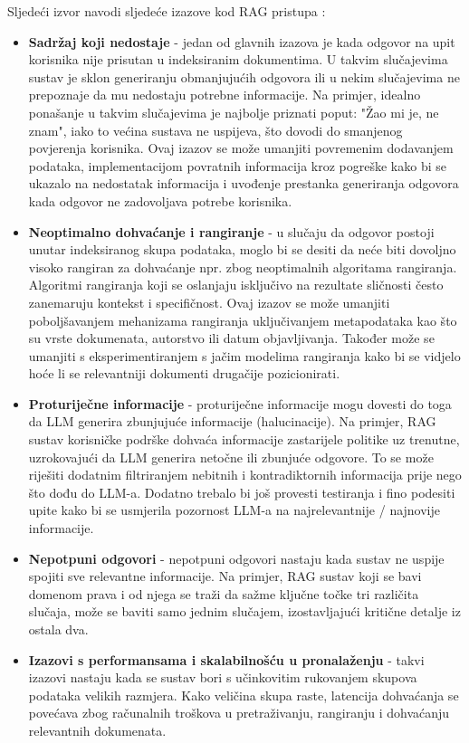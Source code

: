 \documentclass[]{foi}
\begin{document}
Sljedeći izvor navodi sljedeće izazove kod RAG pristupa \cite{aimlabs2025rag}:
\begin{itemize}
    \item \textbf{Sadržaj koji nedostaje} - jedan od glavnih izazova je kada odgovor na upit korisnika nije prisutan u indeksiranim dokumentima. U takvim slučajevima sustav je sklon 
    generiranju obmanjujućih odgovora ili u nekim slučajevima ne prepoznaje da mu nedostaju potrebne informacije. Na primjer, idealno ponašanje
    u takvim slučajevima je najbolje priznati poput: "Žao mi je, ne znam", iako to većina sustava ne uspijeva, što dovodi do smanjenog povjerenja
    korisnika. Ovaj izazov se može umanjiti povremenim dodavanjem podataka, implementacijom povratnih informacija kroz pogreške kako bi se ukazalo na
    nedostatak informacija i uvođenje prestanka generiranja odgovora kada odgovor ne zadovoljava potrebe korisnika. 
    \item \textbf{Neoptimalno dohvaćanje i rangiranje} - u slučaju da odgovor postoji unutar indeksiranog skupa podataka, moglo bi se desiti da neće biti dovoljno visoko rangiran za dohvaćanje 
    npr. zbog neoptimalnih algoritama rangiranja. Algoritmi rangiranja koji se oslanjaju isključivo na rezultate sličnosti često zanemaruju kontekst
    i specifičnost. Ovaj izazov se može umanjiti poboljšavanjem mehanizama rangiranja uključivanjem metapodataka kao što su vrste dokumenata,
    autorstvo ili datum objavljivanja. Također može se umanjiti s eksperimentiranjem s jačim modelima rangiranja kako bi se vidjelo hoće li 
    se relevantniji dokumenti drugačije pozicionirati.
    \item \textbf{Proturiječne informacije} - proturiječne informacije mogu dovesti do toga da LLM generira zbunjujuće informacije (halucinacije). Na primjer, RAG sustav korisničke podrške
    dohvaća informacije zastarijele politike uz trenutne, uzrokovajući da LLM generira netočne ili zbunjuće odgovore. To se može riješiti dodatnim
    filtriranjem nebitnih i kontradiktornih informacija prije nego što dođu do LLM-a. Dodatno trebalo bi još provesti testiranja i fino podesiti
    upite kako bi se usmjerila pozornost LLM-a na najrelevantnije / najnovije informacije. 
    \item \textbf{Nepotpuni odgovori} - nepotpuni odgovori nastaju kada sustav ne uspije spojiti sve relevantne informacije. Na primjer, RAG sustav koji se bavi domenom prava i od njega
    se traži da sažme ključne točke tri različita slučaja, može se baviti samo jednim slučajem, izostavljajući kritične detalje iz ostala dva. 
    \item \textbf{Izazovi s performansama i skalabilnošću u pronalaženju} - takvi izazovi nastaju kada se sustav bori s učinkovitim rukovanjem skupova podataka velikih razmjera. Kako veličina skupa raste, latencija
    dohvaćanja se povećava zbog računalnih troškova u pretraživanju, rangiranju i dohvaćanju relevantnih dokumenata. 
\end{itemize}
\newpage
\end{document}
